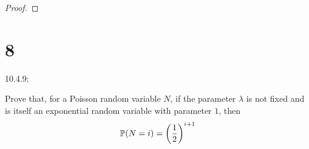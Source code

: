 \documentclass{article}
\begin{document}
\begin{proof}

    
\end{proof}

\newpage

\section*{8}
\begin{ques}\label{q8}
    10.4.9:

    Prove that, for a Poisson random variable $N$, if the parameter $\lambda$ is not fixed and is itself an exponential random variable with parameter $1$, then 
    $$\mathbb{P}(N=i) = \left(\frac{1}{2}\right)^{i+1}$$
\end{ques}
\end{document}
